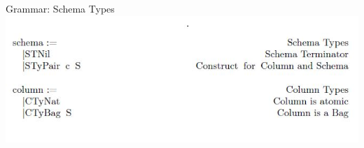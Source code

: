 \begin{frame}{Grammar: Schema Types}
\centering
%
%
\includegraphics[scale=0.6]{Images/Grammar/Schema.JPG}
\end{frame}

